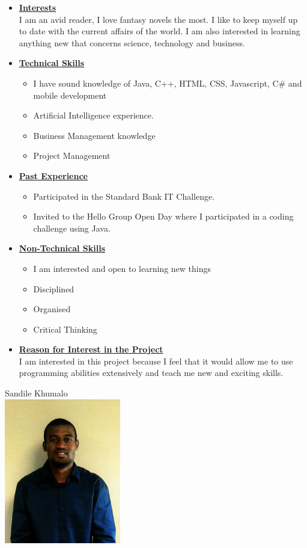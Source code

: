 \documentclass[a4paper,12pt]{article}
\begin{document}
\begin{itemize}
\item {\Large \underline{\textbf{Interests}}}\\[0.2cm]
I am an avid reader, I love fantasy novels the most. I like to keep myself up to date with the current affairs of the world. I am also interested in learning anything new that concerns science, technology and business.
\\
\item {\Large \underline{\textbf{Technical Skills}}}
	\begin{itemize}
		\item I have sound knowledge of Java, C++, HTML, CSS, Javascript, C\# and mobile development 
		\item Artificial Intelligence experience.
		\item Business Management knowledge
		\item Project Management
	\end{itemize}
\bigskip
\item {\Large \underline{\textbf{Past Experience}}}
\begin{itemize}
\item Participated in the Standard Bank IT Challenge.
\item Invited to the Hello Group Open Day where I participated in a coding challenge using Java.
\end{itemize}
\bigskip
\item {\Large \underline{\textbf{Non-Technical Skills}}}
\begin{itemize}
\item I am interested and open to learning new things
\item Disciplined
\item Organised
\item Critical Thinking
\end{itemize}
\bigskip
\item {\Large \underline{\textbf{Reason for Interest in the Project}}}\\[0.2cm]
I am interested in this project because I feel that it would allow me to use programming abilities extensively and teach me new and exciting skills.

\newpage
\end{itemize}
\begin{center}
{\Large Sandile {Khumalo}} \\[0.3cm]
\includegraphics[width=2in]{Sandile.jpg}\\[0.4cm] 
\end{center}
\end{document}
